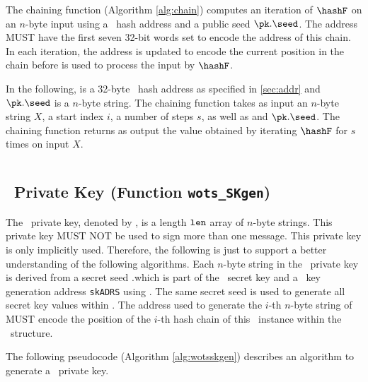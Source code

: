 The chaining function (Algorithm \ref{alg:chain}) computes an iteration of $\hashF$ on an $n$-byte input using
a \WOTSCS\ hash address \ADRS and a public seed $\pk.\seed$. The address \ADRS MUST
have the first seven 32-bit words set to encode the address of this chain. In each iteration, the address is updated to encode the current position in the chain before \ADRS is used to process the input by $\hashF$.

In the following, \ADRS is a 32-byte \WOTSCS\ hash address as specified in \cref{sec:addr} and $\pk.\seed$ is a $n$-byte string. The chaining function takes as input an $n$-byte string $X$, a start index $i$, a number of steps $s$, as well as \ADRS and $\pk.\seed$. The chaining function returns as output the value obtained by iterating $\hashF$ for $s$ times on input $X$.

\begin{algorithm}
\inputminted[breaklines,linenos,tabsize=2,mathescape,escapeinside=||]{C}{code/chain.cs}
\caption{{\tt chain} --- Chaining function used in \WOTSCS.}
\label{alg:chain}
\end{algorithm}


\subsection{\WOTSCS\ Private Key (Function \texttt{wots\_SKgen})}

The \WOTSCS\ private key, denoted by \sk, is a length $\tt len$ array of $n$-byte strings. This private key MUST NOT be used to sign more than one message. This private key is only implicitly used. Therefore, the following is just to support a better understanding of the following algorithms. Each $n$-byte string in the \WOTSCS\ private key is derived from a secret seed \sk.\seed which is part of the \SPHINCSA\ secret key and a \WOTSCS\ key generation address \texttt{skADRS} using \PRF. The same secret seed is used to generate all secret key values within \SPHINCSA. The address used to generate the $i$-th $n$-byte string of \sk MUST encode the position of the $i$-th hash chain of this \WOTSCS\ instance within the \SPHINCSA\ structure. 

The following pseudocode (Algorithm \ref{alg:wotsskgen}) describes an algorithm to generate a \WOTSCS\ private key.

\begin{algorithm}
\inputminted[breaklines,linenos,tabsize=2,mathescape,escapeinside=||]{C}{code/wots_SKgen.cs}
\caption{\texttt{wots\_SKgen} --- Generating a \WOTSCS\ private key.}
\label{alg:wotsskgen}
\end{algorithm}

